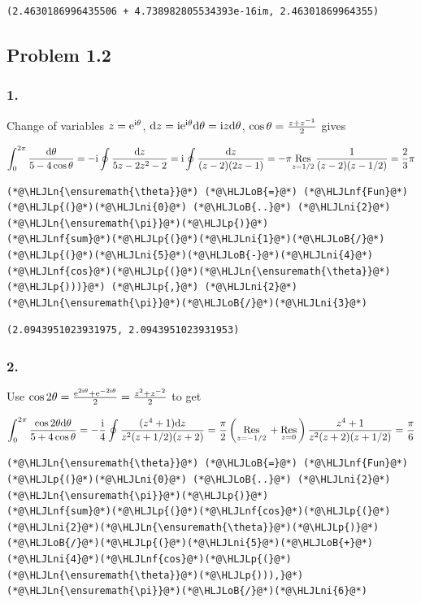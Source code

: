 \documentclass[12pt,a4paper]{article}
\newcommand{\HLJLn}[1]{#1}
\newcommand{\HLJLnf}[1]{\textcolor[RGB]{66,102,213}{#1}}
\newcommand{\HLJLni}[1]{\textcolor[RGB]{59,151,46}{#1}}
\newcommand{\HLJLoB}[1]{\textcolor[RGB]{102,102,102}{\textbf{#1}}}
\newcommand{\HLJLp}[1]{#1}
\def\D{ {\rm d} }
\def\I{ {\rm i} }
\def\E{ {\rm e} }
\def\Res_#1{\underset{#1}{\rm Res}\,}
\def\dz{\D z}
\begin{document}
\begin{lstlisting}
(2.4630186996435506 + 4.738982805534393e-16im, 2.46301869964355)
\end{lstlisting}


\subsection{Problem 1.2}
\subsubsection{1.}
Change of variables $z = \E^{\I \theta}$, $\dz = \I \E^{\I \theta} \D\theta = \I z \D\theta$, $\cos \theta = {z + z^{-1} \over 2}$ gives

\[
\int_0^{2 \pi} {\D\theta \over 5-4 \cos \theta}  = - \I \oint {\dz \over 5z - 2z^2 - 2}  = \I \oint {\dz \over (z-2)(2z-1)} = -\pi \Res_{z=1/2} {1 \over (z-2)(z-1/2)} = {2 \over 3} \pi 
\]

\begin{lstlisting}
(*@\HLJLn{\ensuremath{\theta}}@*) (*@\HLJLoB{=}@*) (*@\HLJLnf{Fun}@*)(*@\HLJLp{(}@*)(*@\HLJLni{0}@*) (*@\HLJLoB{..}@*) (*@\HLJLni{2}@*)(*@\HLJLn{\ensuremath{\pi}}@*)(*@\HLJLp{)}@*)
(*@\HLJLnf{sum}@*)(*@\HLJLp{(}@*)(*@\HLJLni{1}@*)(*@\HLJLoB{/}@*)(*@\HLJLp{(}@*)(*@\HLJLni{5}@*)(*@\HLJLoB{-}@*)(*@\HLJLni{4}@*)(*@\HLJLnf{cos}@*)(*@\HLJLp{(}@*)(*@\HLJLn{\ensuremath{\theta}}@*)(*@\HLJLp{)))}@*) (*@\HLJLp{,}@*) (*@\HLJLni{2}@*)(*@\HLJLn{\ensuremath{\pi}}@*)(*@\HLJLoB{/}@*)(*@\HLJLni{3}@*)
\end{lstlisting}

\begin{lstlisting}
(2.0943951023931975, 2.0943951023931953)
\end{lstlisting}


\subsubsection{2.}
Use $\cos 2 \theta = { \E^{2 \I \theta} + \E^{-2 \I \theta} \over 2} = {z^2 + z^{-2} \over 2}$ to get

\[
\int_0^{2 \pi} {\cos 2 \theta \D\theta \over 5+4 \cos \theta}  = - {\I \over 4} \oint { (z^4 + 1)\dz \over z^2 (z+1/2)(z+2)}  = {\pi \over 2} \left( \Res_{z=-1/2} + \Res_{z=0}\right) {z^4+1 \over z^2(z+2)(z+1/2)} = {\pi \over 6}
\]

\begin{lstlisting}
(*@\HLJLn{\ensuremath{\theta}}@*) (*@\HLJLoB{=}@*) (*@\HLJLnf{Fun}@*)(*@\HLJLp{(}@*)(*@\HLJLni{0}@*) (*@\HLJLoB{..}@*) (*@\HLJLni{2}@*)(*@\HLJLn{\ensuremath{\pi}}@*)(*@\HLJLp{)}@*)
(*@\HLJLnf{sum}@*)(*@\HLJLp{(}@*)(*@\HLJLnf{cos}@*)(*@\HLJLp{(}@*)(*@\HLJLni{2}@*)(*@\HLJLn{\ensuremath{\theta}}@*)(*@\HLJLp{)}@*)(*@\HLJLoB{/}@*)(*@\HLJLp{(}@*)(*@\HLJLni{5}@*)(*@\HLJLoB{+}@*)(*@\HLJLni{4}@*)(*@\HLJLnf{cos}@*)(*@\HLJLp{(}@*)(*@\HLJLn{\ensuremath{\theta}}@*)(*@\HLJLp{))),}@*) (*@\HLJLn{\ensuremath{\pi}}@*)(*@\HLJLoB{/}@*)(*@\HLJLni{6}@*)
\end{lstlisting}
\end{document}
